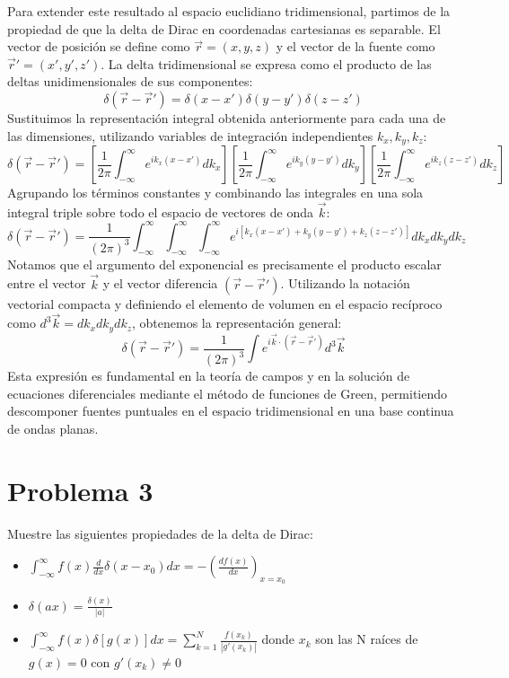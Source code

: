 \documentclass[a4paper]{article}
\begin{document}
Para extender este resultado al espacio euclidiano tridimensional, partimos de la propiedad de que la delta de Dirac en coordenadas cartesianas es separable. El vector de posición se define como $\vec{r} = (x, y, z)$ y el vector de la fuente como $\vec{r}' = (x', y', z')$. La delta tridimensional se expresa como el producto de las deltas unidimensionales de sus componentes:
$$ \delta(\vec{r} - \vec{r}') = \delta(x - x') \delta(y - y') \delta(z - z') $$
Sustituimos la representación integral obtenida anteriormente para cada una de las dimensiones, utilizando variables de integración independientes $k_x, k_y, k_z$:
$$ \delta(\vec{r} - \vec{r}') = \left[ \frac{1}{2\pi} \int_{-\infty}^{\infty} e^{ik_x(x-x')} dk_x \right] \left[ \frac{1}{2\pi} \int_{-\infty}^{\infty} e^{ik_y(y-y')} dk_y \right] \left[ \frac{1}{2\pi} \int_{-\infty}^{\infty} e^{ik_z(z-z')} dk_z \right] $$
Agrupando los términos constantes y combinando las integrales en una sola integral triple sobre todo el espacio de vectores de onda $\vec{k}$:
$$ \delta(\vec{r} - \vec{r}') = \frac{1}{(2\pi)^3} \int_{-\infty}^{\infty} \int_{-\infty}^{\infty} \int_{-\infty}^{\infty} e^{i [k_x(x-x') + k_y(y-y') + k_z(z-z')]} dk_x dk_y dk_z $$
Notamos que el argumento del exponencial es precisamente el producto escalar entre el vector $\vec{k}$ y el vector diferencia $(\vec{r} - \vec{r}')$. Utilizando la notación vectorial compacta y definiendo el elemento de volumen en el espacio recíproco como $d^3\vec{k} = dk_x dk_y dk_z$, obtenemos la representación general:
$$ \delta(\vec{r} - \vec{r}') = \frac{1}{(2\pi)^3} \int e^{i \vec{k} \cdot (\vec{r} - \vec{r}')} d^3\vec{k} $$
Esta expresión es fundamental en la teoría de campos y en la solución de ecuaciones diferenciales mediante el método de funciones de Green, permitiendo descomponer fuentes puntuales en el espacio tridimensional en una base continua de ondas planas.

\section{Problema 3}
Muestre las siguientes propiedades de la delta de Dirac:
\begin{itemize}
    \item $\int_{-\infty}^{\infty} f(x) \frac{d}{dx} \delta(x-x_0) dx = - \left( \frac{df(x)}{dx} \right)_{x=x_0}$
    \item $\delta(ax) = \frac{\delta(x)}{|a|}$
    \item $\int_{-\infty}^{\infty} f(x) \delta[g(x)] dx = \sum_{k=1}^N \frac{f(x_k)}{|g'(x_k)|}$ donde $x_k$ son las N raíces de $g(x) = 0$ con $g'(x_k) \neq 0$
\end{itemize}
\end{document}
